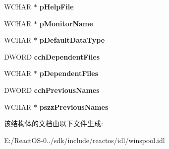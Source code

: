 \begin{DoxyCompactItemize}
\mbox{\label{struct___w_i_n_s_p_o_o_l___d_r_i_v_e_r___i_n_f_o__4_acb01f58c3be07acb347689e5ea9f6ea9}} 
W\+C\+H\+AR $\ast$ {\bfseries p\+Help\+File}
\item 
\mbox{\label{struct___w_i_n_s_p_o_o_l___d_r_i_v_e_r___i_n_f_o__4_a27550f2d43b9fb66c2ad1d1a496d449b}} 
W\+C\+H\+AR $\ast$ {\bfseries p\+Monitor\+Name}
\item 
\mbox{\label{struct___w_i_n_s_p_o_o_l___d_r_i_v_e_r___i_n_f_o__4_a025eca0a4361d79ee85f53122b31b646}} 
W\+C\+H\+AR $\ast$ {\bfseries p\+Default\+Data\+Type}
\item 
\mbox{\label{struct___w_i_n_s_p_o_o_l___d_r_i_v_e_r___i_n_f_o__4_a98c64475f4c9c1f1f865cdb721747d78}} 
D\+W\+O\+RD {\bfseries cch\+Dependent\+Files}
\item 
\mbox{\label{struct___w_i_n_s_p_o_o_l___d_r_i_v_e_r___i_n_f_o__4_a971787adac7e691ff7585393d2ec5428}} 
W\+C\+H\+AR $\ast$ {\bfseries p\+Dependent\+Files}
\item 
\mbox{\label{struct___w_i_n_s_p_o_o_l___d_r_i_v_e_r___i_n_f_o__4_a93328dedd8f7c12b50a89512972bcda5}} 
D\+W\+O\+RD {\bfseries cch\+Previous\+Names}
\item 
\mbox{\label{struct___w_i_n_s_p_o_o_l___d_r_i_v_e_r___i_n_f_o__4_a32a92e87e4085e78196c36af6ec9fc03}} 
W\+C\+H\+AR $\ast$ {\bfseries pszz\+Previous\+Names}
\end{DoxyCompactItemize}


该结构体的文档由以下文件生成\+:\begin{DoxyCompactItemize}
\item 
E\+:/\+React\+O\+S-\/0../sdk/include/reactos/idl/winspool.\+idl\end{DoxyCompactItemize}
